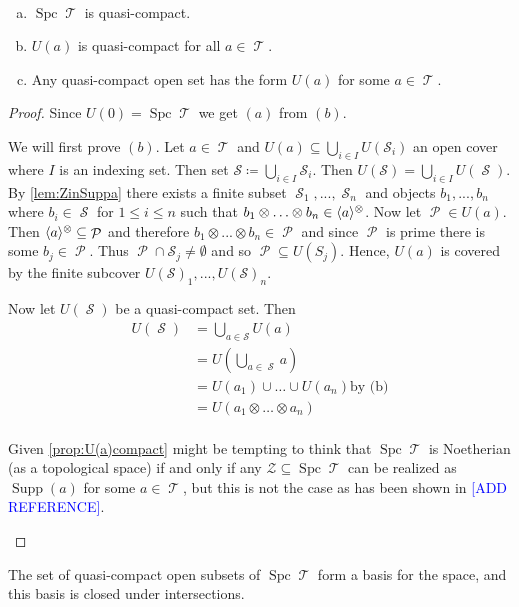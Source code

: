 \documentclass[11pt]{article}
\DeclareMathOperator{\cS}{\mathcal{S}}
\DeclareMathOperator{\TT}{\mathcal{T}}
\DeclareMathOperator{\cP}{\mathcal{P}}
\DeclareMathOperator{\supp}{Supp}
\DeclareMathOperator{\spc}{Spc}
\begin{document}
\begin{prop}\label{prop:U(a)compact}
	\
\begin{enumerate}[(a)]
	\item $\spc \TT$ is quasi-compact.
	\item $U(a)$ is quasi-compact for all $a \in \TT$.
	\item Any quasi-compact open set has the form $U(a)$ for some $a \in \TT$.
\end{enumerate}
\end{prop}
\begin{proof}
Since $U(0) = \spc\TT$ we get $(a)$ from $(b)$.

We will first prove $(b)$. Let $a \in \TT$ and $U(a) \subseteq \bigcup_{i \in I}U(\mathcal{S}_i)$ an open cover where $I$ is an indexing set. Then set $\mathcal{S} \coloneqq \bigcup_{i \in I}\mathcal{S}_i$. Then $U(\mathcal{S}) = \bigcup_{i \in I}U(\cS)$. By \autoref{lem:ZinSuppa} there exists a finite subset $\cS_1,...,\cS_n$ and objects $b_1,...,b_n$ where $b_i \in \cS$ for $1 \leq i \leq n$ such that $b_1 \otimes \hdots \otimes b_n \in \langle a \rangle^{\otimes}$. Now let $\cP \in U(a)$. Then $\la a \ra^{\otimes} \subseteq \cP$ and therefore $ b_1 \otimes...\otimes b_n \in \cP$ and since $\cP$ is prime there is some $b_j \in \cP$. Thus $\cP \cap \mathcal{S}_j \not=\emptyset$ and so $\cP \subseteq U(S_j)$. Hence, $U(a)$ is covered by the finite subcover $U(\mathcal{S})_1,...,U(\mathscr{S})_n$.

Now let $U(\cS)$ be a quasi-compact set. Then
\begin{align*}
	U(\cS) &= \bigcup_{a \in \mathcal{S}}U(a)\\
	       &= U\left( \bigcup_{a \in \cS}a\right)\\
	       &=U(a_1) \cup \hdots \cup U(a_n)  \text{by (b)}\\
	       &= U(a_1 \otimes \hdots \otimes a_n)\\
\end{align*}
\begin{rmk}
	Given \autoref{prop:U(a)compact} might be tempting to think that $\spc \TT$ is Noetherian (as a topological space) if and only if any $\mathcal{Z} \subseteq \spc \TT$ can be realized as $\supp(a)$ for some $a \in \TT$, but this is not the case as has been shown in \textcolor{blue}{[ADD REFERENCE]}.
\end{rmk}
\end{proof}

\begin{cor}
The set of quasi-compact open subsets of $\spc \TT$ form a basis for the space, and this basis is closed under intersections.
\end{cor}
\end{document}
